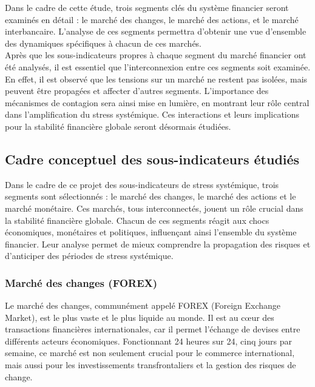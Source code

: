 \begin{sloppypar}
Dans le cadre de cette étude, trois segments clés du système financier seront examinés en détail : le marché des changes, le marché des actions, et le marché interbancaire. L'analyse de ces segments permettra d'obtenir une vue d'ensemble des dynamiques spécifiques à chacun de ces marchés.\\

Après que les sous-indicateurs propres à chaque segment du marché financier ont été analysés, il est essentiel que l’interconnexion entre ces segments soit examinée. En effet, il est observé que les tensions sur un marché ne restent pas isolées, mais peuvent être propagées et affecter d'autres segments. L'importance des mécanismes de contagion sera ainsi mise en lumière, en montrant leur rôle central dans l'amplification du stress systémique. Ces interactions et leurs implications pour la stabilité financière globale seront désormais étudiées.

\subsection{Cadre conceptuel des sous-indicateurs étudiés}

Dans le cadre de ce projet des sous-indicateurs de stress systémique, trois segments sont sélectionnés : le marché des changes, le marché des actions et le marché monétaire. Ces marchés, tous interconnectés, jouent un rôle crucial dans la stabilité financière globale. Chacun de ces segments réagit aux chocs économiques, monétaires et politiques, influençant ainsi l'ensemble du système financier. Leur analyse permet de mieux comprendre la propagation des risques et d'anticiper des périodes de stress systémique.

\subsubsection{Marché des changes (FOREX)}

Le marché des changes, communément appelé FOREX (Foreign Exchange Market), est le plus vaste et le plus liquide au monde. Il est au cœur des transactions financières internationales, car il permet l'échange de devises entre différents acteurs économiques. Fonctionnant 24 heures sur 24, cinq jours par semaine, ce marché est non seulement crucial pour le commerce international, mais aussi pour les investissements transfrontaliers et la gestion des risques de change.\\


\end{sloppypar}
